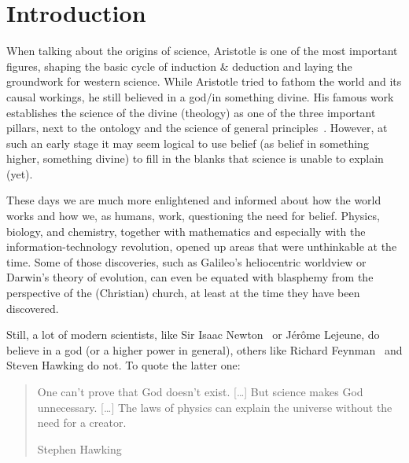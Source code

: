 \section{Introduction}

When talking about the origins of science, Aristotle is one of the most important figures, shaping the basic cycle of induction \& deduction and laying the groundwork for western science.
While Aristotle tried to fathom the world and its causal workings, he still believed in a god/in something divine.
His famous work  establishes the science of the divine (theology) as one of the three important pillars, next to the ontology and the science of general principles~\cite{aristotle350}.
However, at such an early stage it may seem logical to use belief  (as belief in something higher, something divine) to fill in the blanks that science is unable to explain (yet).

These days we are much more enlightened and informed about how the world works and how we, as humans, work, questioning the need for belief.
Physics, biology, and chemistry, together with mathematics and especially with the information-technology revolution, opened up areas that were unthinkable at the time.
Some of those discoveries, such as Galileo's heliocentric worldview or Darwin's theory of evolution, can even be equated with blasphemy from the perspective of the (Christian) church, at least at the time they have been discovered.

Still, a lot of modern scientists, like Sir Isaac Newton~\cite[p. 315]{westfall1983} or Jérôme Lejeune, do believe in a god (or a higher power in general), others like Richard Feynman~\cite{feynman2001,brian2001} and Steven Hawking do not.
To quote the latter one:
\blockquote[Stephen Hawking]{One can't prove that God doesn't exist. \textcolor{gray}{[\ldots]} But science makes God unnecessary. \textcolor{gray}{[\ldots]} The laws of physics can explain the universe without the need for a creator.}

